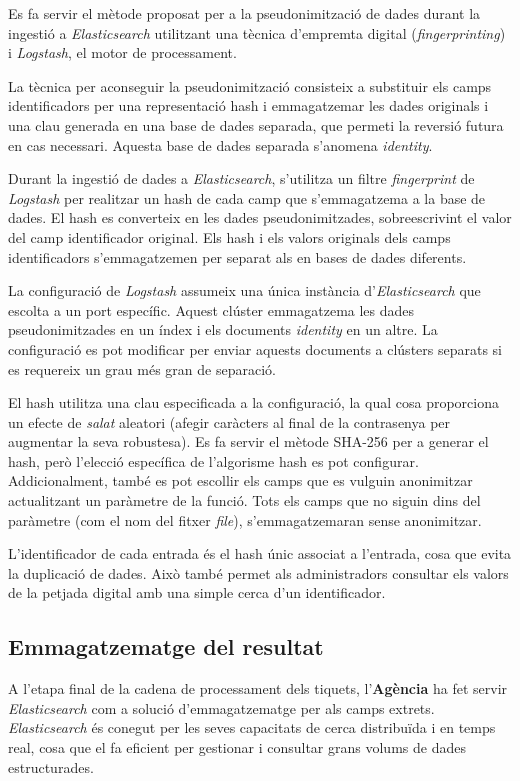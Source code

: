 Es fa servir el mètode proposat per a la pseudonimització de dades durant la ingestió a \textit{Elasticsearch} utilitzant una tècnica d'empremta digital (\textit{fingerprinting}) i \textit{Logstash}, el motor de processament.

La tècnica per aconseguir la pseudonimització consisteix a substituir els camps identificadors per una representació hash i emmagatzemar les dades originals i una clau generada en una base de dades separada, que permeti la reversió futura en cas necessari. Aquesta base de dades separada s'anomena \textit{identity}.

Durant la ingestió de dades a \textit{Elasticsearch}, s'utilitza un filtre \textit{fingerprint} de \textit{Logstash} per realitzar un hash de cada camp que s'emmagatzema a la base de dades. El hash es converteix en les dades pseudonimitzades, sobreescrivint el valor del camp identificador original. Els hash i els valors originals dels camps identificadors s'emmagatzemen per separat als en bases de dades diferents.

La configuració de \textit{Logstash} assumeix una única instància d'\textit{Elasticsearch} que escolta a un port específic. Aquest clúster emmagatzema les dades pseudonimitzades en un índex i els documents \textit{identity} en un altre. La configuració es pot modificar per enviar aquests documents a clústers separats si es requereix un grau més gran de separació.

El hash utilitza una clau especificada a la configuració, la qual cosa proporciona un efecte de \textit{salat} aleatori (afegir caràcters al final de la contrasenya per augmentar la seva robustesa). Es fa servir el mètode SHA-256 per a generar el hash, però l'elecció específica de l'algorisme hash es pot configurar. Addicionalment, també es pot escollir els camps que es vulguin anonimitzar actualitzant un paràmetre de la funció. Tots els camps que no siguin dins del paràmetre (com el nom del fitxer \textit{file}), s'emmagatzemaran sense anonimitzar.

L'identificador de cada entrada és el hash únic associat a l'entrada, cosa que evita la duplicació de dades. Això també permet als administradors consultar els valors de la petjada digital amb una simple cerca d'un identificador.

\subsection{Emmagatzematge del resultat}
A l'etapa final de la cadena de processament dels tiquets, l'\textbf{Agència} ha fet servir \textit{Elasticsearch} com a solució d'emmagatzematge per als camps extrets. \textit{Elasticsearch} és conegut per les seves capacitats de cerca distribuïda i en temps real, cosa que el fa eficient per gestionar i consultar grans volums de dades estructurades.

